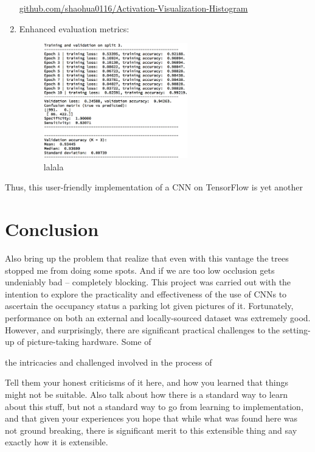 \documentclass[a4paper, 11pt]{article} %
\begin{document}
\begin{enumerate}
{		\hyperlink{https://github.com/shaohua0116/Activation-Visualization-Histogram}
			{github.com/shaohua0116/Activation-Visualization-Histogram}}
		\item Enhanced evaluation metrics:
		\begin{figure}[H]
			\centering
			\includegraphics[height=5cm]{figures/floydhub_results_example}
			\caption{lalala}
		\end{figure}
	\end{enumerate}
	Thus, this user-friendly implementation of a CNN on TensorFlow is yet 
	another 

\section{Conclusion}
	Also bring up the problem that realize that even with this vantage the 
	trees stopped me from doing some spots. And if we are too low occlusion 
	gets undeniably bad -- completely blocking.
	This project was carried out with the intention to explore the practicality 
	and effectiveness of the use of CNNs to ascertain the occupancy status a 
	parking lot given pictures of it. Fortunately, performance on both an 
	external and locally-sourced dataset was extremely good. However, and 
	surprisingly, there are significant practical challenges to the setting-up 
	of picture-taking hardware. Some of 
	
	the intricacies and challenged involved in the process of 



	Tell them your honest criticisms of it here, and how you learned that things
	might not be suitable.
	Also talk about how there is a standard way to learn about this stuff, but
	not a standard way to go from learning to implementation, and that given your
	experiences you hope that while what was found here was not ground breaking,
	there is significant merit to this extensible thing and say exactly how it is
	extensible.
\end{document}
